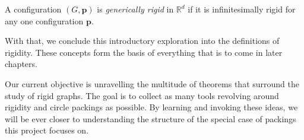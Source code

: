 \begin{definition}
A configuration $(G,\mathbf{p})$ is \textit{generically rigid} in $\mathbb{R}^d$ if it is infinitesimally rigid for any one configuration $\mathbf{p}$.
\end{definition}

\begin{flushleft}
With that, we conclude this introductory exploration into the definitions of rigidity. These concepts form the basis of everything that is to come in later chapters. 
\end{flushleft}

\begin{flushleft}
Our current objective is unravelling the multitude of theorems that surround the study of rigid graphs. The goal is to collect as many tools revolving around rigidity and circle packings as possible. By learning and invoking these ideas, we will be ever closer to understanding the structure of the special case of packings this project focuses on.
\end{flushleft}